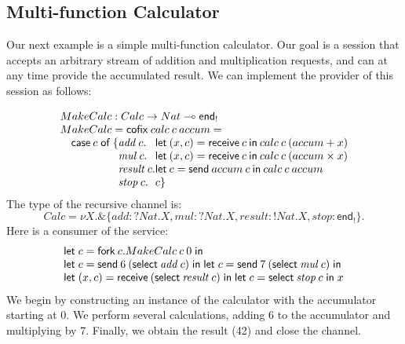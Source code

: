 \documentclass[orivec,envcountsame]{llncs}
\makeatletter
\newcommand{\with}{\mathbin\binampersand}
\newcommand{\gvout}[2]{{!#1.#2}}
\newcommand{\gvin}[2]{{?#1.#2}}
\newcommand{\lto}{\ensuremath{\multimap}}
\newcommand{\uto}{\ensuremath{\rightarrow}}
\newcommand{\outterm}{\mkwd{end}_!}
\newcommand{\interm}{\mkwd{end}_?}
\newcommand{\mkwd}[1]{\mathsf{#1}}
\newcommand{\tkwd}[1]{\textsf{#1}}
\newcommand{\clabel}[1]{\mathit{#1}}
\newcommand{\gvsend}[2]{\mkwd{send}\:#1\:#2}
\newcommand{\gvreceive}[1]{\mkwd{receive}\:#1}
\newcommand{\gvlet}[3]{\mkwd{let}\;#1 = #2\;\mkwd{in}\;#3}
\newcommand{\gvselect}[2]{\mkwd{select}\:#1\:#2}
\newcommand{\gvfork}[2]{\mkwd{fork}\:#1.#2}
\newcommand{\lrkwd}{\mkwd{cofix}}
\newcommand{\ba}{\begin{array}}
\newcommand{\ea}{\end{array}}
\newcommand{\bl}{\ba[t]{@{}l@{}}}
\newcommand{\el}{\ea}
\makeatother
\begin{document}
\subsection{Multi-function Calculator}

Our next example is a simple multi-function calculator. Our goal is a session that accepts an
arbitrary stream of addition and multiplication requests, and can at any time provide the
accumulated result.  We can implement the provider of this session as follows:

\small\[
\bl
MakeCalc : Calc \uto Nat \lto \outterm \\
MakeCalc = \lrkwd\:calc\:c\:accum = \\
\quad
  \bl
  \mkwd{case}\:c\;\mkwd{of}\:\{
    \ba[t]{@{}l@{}l@{}}
    \clabel{add}\:c.
      & \mkwd{let}\:(x,c) = \gvreceive{c} \: \mkwd{in}\:
      calc\:c\:(accum + x) \\
    \clabel{mul}\:c.
      & \mkwd{let}\:(x,c) = \gvreceive{c}\:\mkwd{in}\:
      calc\:c\:(accum \times x) \\
    \clabel{result}\:c.
      & \mkwd{let}\:c = \gvsend{accum}{c}\:\mkwd{in}\:
        calc\:c\:accum \\
    \clabel{stop}\:c.& c \}
    \ea \\
  \el \\
\el
\]\normalsize
The type of the recursive channel is:
\small\[
 Calc = \nu X. \with \{ \clabel{add}: \gvin{Nat}{X},
                        \clabel{mul}: \gvin{Nat}{X},
                        \clabel{result}: \gvout{Nat}{X},
                        \clabel{stop}: \outterm \}.
\]%
Here is a consumer of the service:
\small\[
\bl
  \gvlet{c}{\gvfork{c}{MakeCalc\:c\:0}}{} \\
  \gvlet{c}{\gvsend{6}{(\gvselect{\clabel{add}}{c})}}{
  \gvlet{c}{\gvsend{7}{(\gvselect{\clabel{mul}}{c})}}{}} \\
  \gvlet{(x,c)}{\gvreceive{(\gvselect{\clabel{result}}{c})}}{
  \gvlet{c}{\gvselect{\clabel{stop}}{c}}{x}}
\el
\]\normalsize
We begin by constructing an instance of the calculator with the accumulator starting at 0. %
We perform several calculations, adding 6 to the accumulator and multiplying by 7.  Finally, we
obtain the result (42) and close the channel.
\end{document}
